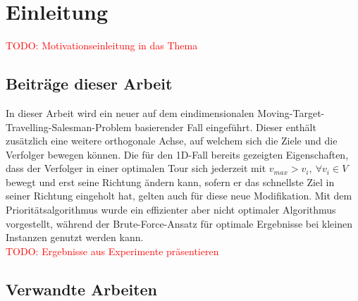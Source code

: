 \documentclass[german,version-2019-11]{uzl-thesis}
\begin{document}
\chapter{Einleitung}

\textcolor{red}{TODO: Motivationseinleitung in das Thema}


\section{Beiträge dieser Arbeit}

In dieser Arbeit wird ein neuer auf dem eindimensionalen Moving-Target-Travelling-Salesman-Problem basierender Fall eingeführt. Dieser enthält zusätzlich eine weitere orthogonale Achse, auf welchem sich die Ziele und die Verfolger bewegen können. Die für den 1D-Fall bereits gezeigten Eigenschaften, dass der Verfolger in einer optimalen Tour sich jederzeit mit $v_{max}>v_i,~\forall v_i\in V$ bewegt und erst seine Richtung ändern kann, sofern er das schnellste Ziel in seiner Richtung eingeholt hat, gelten auch für diese neue Modifikation. Mit dem Prioritätsalgorithmus wurde ein effizienter aber nicht optimaler Algorithmus vorgestellt, während der Brute-Force-Ansatz für optimale Ergebnisse bei kleinen Instanzen genutzt werden kann. \\
\textcolor{red}{TODO: Ergebnisse aus Experimente präsentieren}


\section{Verwandte Arbeiten}
\end{document}
